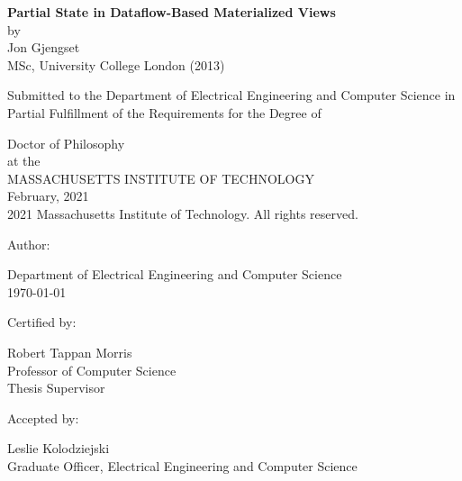 \documentclass[fontsize=12pt,paper=letter]{scrartcl}
\begin{document}
\begin{titlepage}
  \begin{center}
    \textbf{\large Partial State in Dataflow-Based Materialized Views}\\
    \vspace{0.5\baselineskip}
    by\\
    \vspace{0.5\baselineskip}
    {\large Jon Gjengset}\\
    \vspace{0.5\baselineskip}
    MSc, University College London (2013)\\
    \vspace{0.5\baselineskip}
    \begin{addmargin}[0.5in]{0.5in}
      \centering
      Submitted to the Department of
      Electrical Engineering and Computer Science
      in Partial Fulfillment of the Requirements for the Degree of\\
    \end{addmargin}
    \vspace{0.5\baselineskip}
    Doctor of Philosophy\\
    \vspace{0.5\baselineskip}
    at the\\
    \vspace{0.5\baselineskip}
    MASSACHUSETTS INSTITUTE OF TECHNOLOGY\\
    \vspace{0.5\baselineskip}
    February, 2021\\
    \vspace{0.5\baselineskip}
    \textcopyright{} 2021 Massachusetts Institute of Technology.
    All rights reserved.
  \end{center}

  \vspace{2\baselineskip}
  {
  \raggedright
  Author: \dotfill

  \raggedleft
  Department of Electrical Engineering and Computer Science\\
  \today{}\\
  }

  \vspace{2\baselineskip}
  {
  \raggedright
  Certified by: \dotfill

  \raggedleft
  Robert Tappan Morris\\
  Professor of Computer Science\\
  Thesis Supervisor\\
  }

  \vspace{2\baselineskip}
  {
  \raggedright
  Accepted by: \dotfill

  \raggedleft
  Leslie Kolodziejski\\
  Graduate Officer, Electrical Engineering and Computer Science\\
  }
\end{titlepage}
\end{document}
